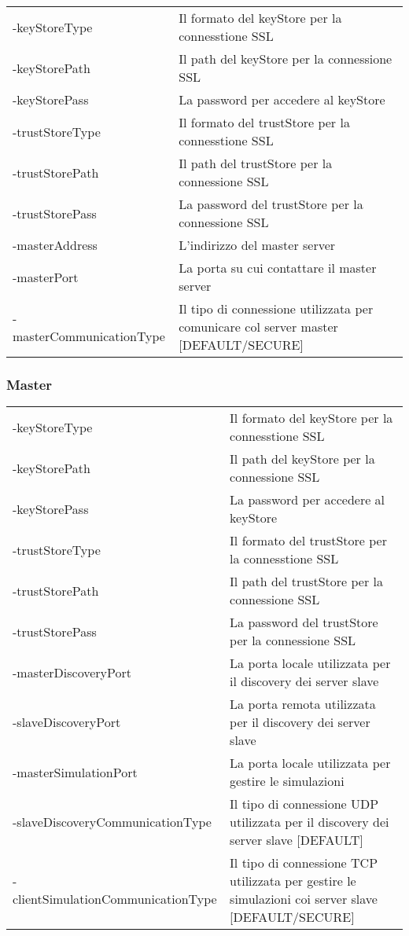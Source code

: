 \begin{table}[H]
    \begin{tabularx}{\linewidth}{ l X }
    -keyStoreType   & Il formato del keyStore per la connesstione SSL   \\
    -keyStorePath   & Il path del keyStore per la connessione SSL       \\
    -keyStorePass   & La password per accedere al keyStore              \\
    -trustStoreType & Il formato del trustStore per la connesstione SSL \\
    -trustStorePath & Il path del trustStore per la connessione SSL     \\
    -trustStorePass & La password del trustStore per la connessione SSL \\
    -masterAddress  & L'indirizzo del master server                     \\
    -masterPort     & La porta su cui contattare il master server       \\
    -masterCommunicationType & Il tipo di connessione utilizzata per comunicare col server master {[}DEFAULT/SECURE{]}
    \end{tabularx}
\end{table}

\subsubsection{Master}

\begin{table}[H]
    \begin{tabularx}{\linewidth}{ l X }
    -keyStoreType         & Il formato del keyStore per la connesstione SSL              \\
    -keyStorePath         & Il path del keyStore per la connessione SSL                  \\
    -keyStorePass         & La password per accedere al keyStore                         \\
    -trustStoreType       & Il formato del trustStore per la connesstione SSL            \\
    -trustStorePath       & Il path del trustStore per la connessione SSL                \\
    -trustStorePass       & La password del trustStore per la connessione SSL            \\
    -masterDiscoveryPort  & La porta locale utilizzata per il discovery dei server slave \\
    -slaveDiscoveryPort   & La porta remota utilizzata per il discovery dei server slave \\
    -masterSimulationPort & La porta locale utilizzata per gestire le simulazioni        \\
    -slaveDiscoveryCommunicationType   & Il tipo di connessione UDP utilizzata per il discovery dei server slave {[}DEFAULT{]}     \\
    -clientSimulationCommunicationType & Il tipo di connessione TCP utilizzata per gestire le simulazioni coi server slave {[}DEFAULT/SECURE{]}
    \end{tabularx}
\end{table}

